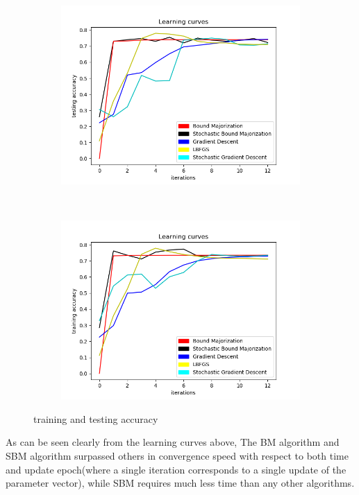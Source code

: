 \documentclass{article}
\begin{document}
\begin{figure}[htbp]
  \centering
  \begin{subfigure}[b]{0.45\textwidth}
      \includegraphics[width=\textwidth]{test_accuracy}
      \caption{}
      \label{test}
  \end{subfigure}
  ~ %
  \begin{subfigure}[b]{0.45\textwidth}
      \includegraphics[width=\textwidth]{train_accuracy}
      \caption{}
      \label{train}
  \end{subfigure}

  \caption{training and testing accuracy}\label{accuracy}
\end{figure}
As can be seen clearly from the learning curves above, The BM algorithm and SBM algorithm surpassed others in convergence speed with respect to both time and
update epoch(where a single iteration corresponds to a single update of the parameter vector), while SBM requires much less time than any other algorithms. 
\end{document}
